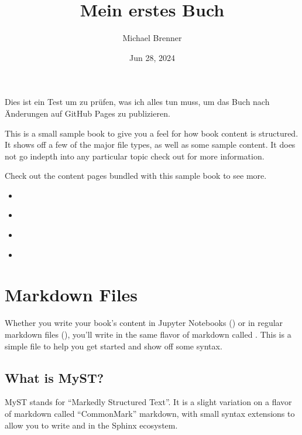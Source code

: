 \documentclass[letterpaper,10pt,english]{jupyterBook}
\title{Mein erstes Buch}
\date{Jun 28, 2024}
\author{Michael Brenner}
\begin{document}
\pagestyle{empty}
\sphinxmaketitle
\pagestyle{plain}
\sphinxtableofcontents
\pagestyle{normal}
\label{\detokenize{intro::doc}}


\sphinxAtStartPar
Dies ist ein Test um zu prüfen, was ich alles tun muss, um das Buch nach
Änderungen auf GitHub Pages zu publizieren.

\sphinxAtStartPar
This is a small sample book to give you a feel for how book content is
structured.
It shows off a few of the major file types, as well as some sample content.
It does not go in\sphinxhyphen{}depth into any particular topic \sphinxhyphen{} check out  for more information.

\sphinxAtStartPar
Check out the content pages bundled with this sample book to see more.
\begin{itemize}
\item {} 
\sphinxAtStartPar
{\hyperref[\detokenize{markdown::doc}]{}}

\item {} 
\sphinxAtStartPar
{\hyperref[\detokenize{notebooks::doc}]{}}

\item {} 
\sphinxAtStartPar
{\hyperref[\detokenize{markdown-notebooks::doc}]{}}

\item {} 
\sphinxAtStartPar
{\hyperref[\detokenize{neue-markdown-datei::doc}]{}}

\end{itemize}

\sphinxstepscope


\chapter{Markdown Files}
\label{\detokenize{markdown:markdown-files}}\label{\detokenize{markdown::doc}}
\sphinxAtStartPar
Whether you write your book’s content in Jupyter Notebooks () or
in regular markdown files (), you’ll write in the same flavor of markdown
called .
This is a simple file to help you get started and show off some syntax.


\section{What is MyST?}
\label{\detokenize{markdown:what-is-myst}}
\sphinxAtStartPar
MyST stands for “Markedly Structured Text”. It
is a slight variation on a flavor of markdown called “CommonMark” markdown,
with small syntax extensions to allow you to write  and 
in the Sphinx ecosystem.
\end{document}
